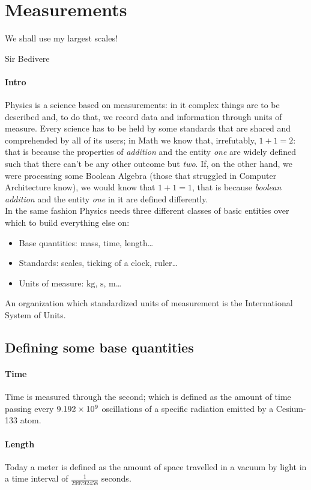 \section{Measurements}
\epigraph{We shall use my largest scales!}{Sir Bedivere}
\paragraph{Intro} Physics is a science based on measurements: in it complex things are to be described and, to do that, we record data and information through units of measure. Every science has to be held by some standards that are shared and comprehended by all of its users; in Math we know that, irrefutably, $1+1=2$: that is because the properties of \emph{addition} and the entity \emph{one} are widely defined such that there can't be any other outcome but \emph{two}. If, on the other hand, we were processing some Boolean Algebra (those that struggled in Computer Architecture know), we would know that $1+1=1$, that is because \emph{boolean addition} and the entity \emph{one} in it are defined differently.\\
In the same fashion Physics needs three different classes of basic entities over which to build everything else on:
\begin{itemize}
    \item Base quantities: mass, time, length\dots
    \item Standards: scales, ticking of a clock, ruler\dots
    \item Units of measure: $\si{\kilogram}$, $\si{\second}$, $\si{\metre}$\dots
\end{itemize}
An organization which standardized units of measurement is the International System of Units.
\subsection{Defining some base quantities}
\paragraph{Time} Time is measured through the second; which is defined as the amount of time passing every $\num{9.192E9}$ oscillations of a specific radiation emitted by a Cesium-133 atom.
\paragraph{Length} Today a meter is defined as the amount of space travelled in a vacuum by light in a time interval of $\frac{1}{299792458}$ seconds.

